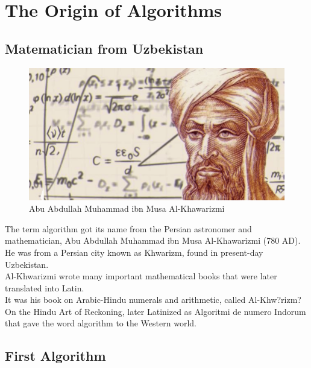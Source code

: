 \chapter{The Origin of Algorithms}\label{ch:1hkdh,kxch,.kdh,}
\section{Matematician from Uzbekistan}

\begin{figure}[h]
    \centering
    \includegraphics[scale=0.4]{figures/alkhwarizmi.png}
    \caption{Abu Abdullah Muhammad ibn Musa Al-Khawarizmi}
    \label{fig:gp}
\end{figure}

The term algorithm got its name from the Persian astronomer and mathematician, Abu Abdullah Muhammad ibn Musa Al-Khawarizmi (780 AD).\\
He was from a Persian city known as Khwarizm, found in present-day Uzbekistan.\\
Al-Khwarizmi wrote many important mathematical books that were later translated into Latin.\\
It was his book on Arabic-Hindu numerals and arithmetic, called Al-Khw?rizm? On the Hindu Art of Reckoning, later Latinized as Algoritmi de numero Indorum that gave the word algorithm to the Western world. \\

\pagebreak

\section{First Algorithm}

